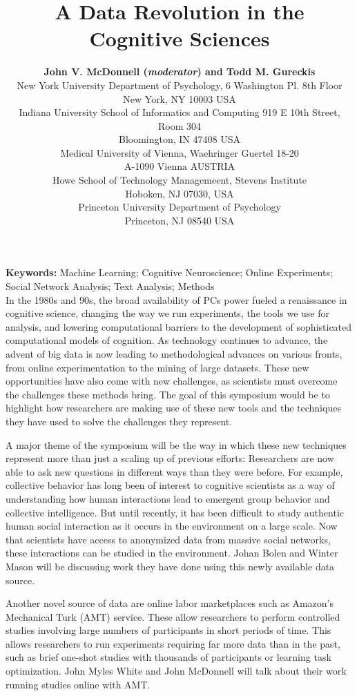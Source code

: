 \documentclass[10pt,letterpaper]{article}
\title{A Data Revolution in the Cognitive Sciences}
\author{{\large \bf John V. McDonnell (\emph{moderator}) and Todd M. Gureckis}  \\
  New York University Department of Psychology, 6 Washington Pl. 8th Floor \\
  New York, NY 10003 USA
  \AND {\large \bf Johan Bolen (jbollen@indiana.edu)} \\
  Indiana University School of Informatics and Computing 919 E 10th Street, Room 304\\
  Bloomington, IN 47408 USA
  \AND {\large \bf Georg Langs (georg.langs@meduniwien.ac.at)} \\
  Medical University of Vienna, Waehringer Guertel 18-20 \\
  A-1090 Vienna AUSTRIA
  \AND {\large \bf Winter Mason, Meeyoung Cha, Krishna Gummadi, Farshad Kooti, and Haeryun Yang} \\
  Howe School of Technology Managemeent, Stevens Institute \\
  Hoboken, NJ 07030, USA
  \AND {\large \bf John Myles White (jmw@johnmyleswhite.com)} \\
  Princeton University Department of Psychology \\
  Princeton, NJ 08540 USA}
\begin{document}
\maketitle


\textbf{Keywords:} 
Machine Learning; Cognitive Neuroscience; Online Experiments; Social Network
Analysis; Text Analysis; Methods\\

In the 1980s and 90s, the broad availability of PCs power fueled a renaissance in
cognitive science, changing the way we run experiments, the tools we use for
analysis, and lowering computational barriers to the development of sophisticated
computational models of cognition. As technology continues to advance, the advent
of big data is now leading to methodological advances on various fronts, from
online experimentation to the mining of large datasets. These new opportunities
have also come with new challenges, as scientists must overcome the challenges
these methods bring. The goal of this symposium would be to highlight how
researchers are making use of these new tools and the techniques they have used
to solve the challenges they represent. 

A major theme of the symposium will be the way in which these new techniques
represent more than just a scaling up of previous efforts: Researchers are now
able to ask new questions in different ways than they were before. For example,
collective behavior has long been of interest to cognitive scientists as a way of
understanding how human interactions lead to emergent group behavior and
collective intelligence. But until recently, it has been difficult to study
authentic human social interaction as it occurs in the environment on a large
scale. Now that scientists have access to anonymized data from massive social
networks, these interactions can be studied in the environment. Johan Bolen and
Winter Mason will be discussing work they have done using this newly available
data source.

Another novel source of data are online labor marketplaces such as Amazon's
Mechanical Turk (AMT) service. These allow researchers to perform controlled
studies involving large numbers of participants in short periods of time. This
allows researchers to run experiments requiring far more data than in the past,
such as brief one-shot studies with thousands of participants or learning task
optimization. John Myles White and John McDonnell will talk about their work
running studies online with AMT.
\end{document}
